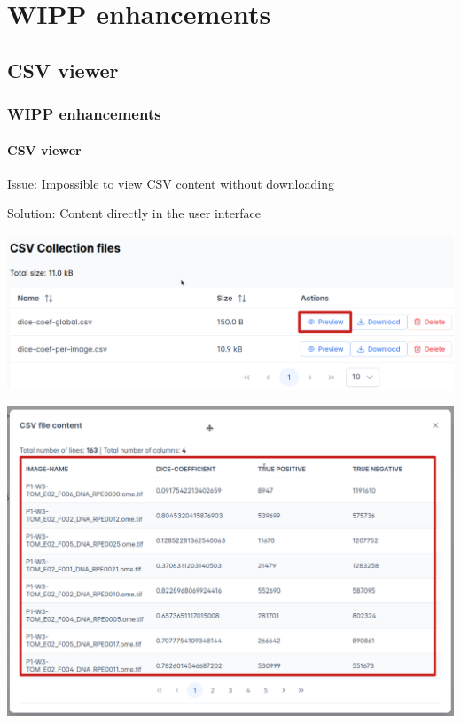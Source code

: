 \def\sectiontitle{WIPP enhancements}

\section{\sectiontitle}

\def\slidetitle{CSV viewer}

\subsection{\slidetitle}
\begin{frame}
  \frametitle{\sectiontitle}
  \framesubtitle{\slidetitle}

  Issue: Impossible to view CSV content without downloading

  Solution: Content directly in the user interface

  \begin{minipage}[h!]{0.10\textwidth}
    \includegraphics[scale=0.16]{./img/csv_actions.png}
  \end{minipage}\hfill
  \begin{minipage}[h!]{0.45\textwidth}
    \includegraphics[scale=0.17]{./img/csv_content.png}
  \end{minipage}
\end{frame}


